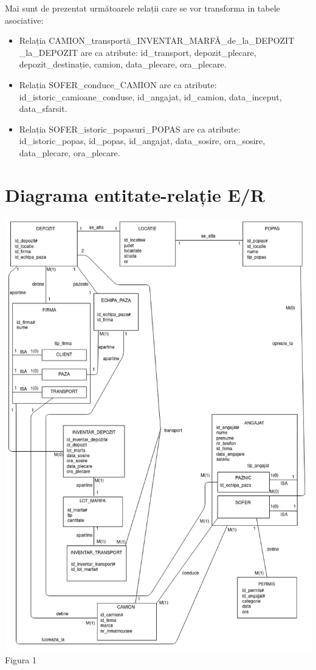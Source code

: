 \documentclass[12pt, a4paper]{article}
\begin{document}
    Mai sunt de prezentat următoarele relații care se vor transforma in tabele asociative:
\begin{itemize}
    \item Relația CAMION\_transportă\_INVENTAR\_MARFĂ\_de\_la\_DEPOZIT\\\_la\_DEPOZIT are ca atribute: id\_transport, depozit\_plecare,\\ depozit\_destinație, camion, data\_plecare, ora\_plecare.
    \item Relația SOFER\_conduce\_CAMION are ca atribute: \\id\_istoric\_camioane\_conduse, id\_angajat, id\_camion, data\_inceput,\\ data\_sfarsit.
    \item Relația SOFER\_istoric\_popasuri\_POPAS are ca atribute: \\id\_istoric\_popas, id\_popas, id\_angajat, data\_sosire, ora\_sosire,\\ data\_plecare, ora\_plecare.
\end{itemize}

\newpage
\section{Diagrama entitate-relație E/R}
\includegraphics[width=\textwidth]{_diagrama_er.png}
\label{Figura 1}
\centering Figura 1
\end{document}

